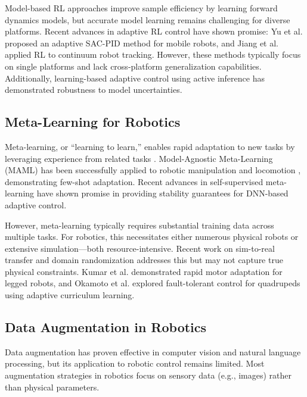 \documentclass[DTMColor]{ROB-New}
\begin{document}
Model-based RL approaches \cite{nagabandi2018neural} improve sample efficiency by learning forward dynamics models, but accurate model learning remains challenging for diverse platforms. Recent advances in adaptive RL control have shown promise: Yu et al. \cite{yu2021adaptive} proposed an adaptive SAC-PID method for mobile robots, and Jiang et al. \cite{jiang2022rl} applied RL to continuum robot tracking. However, these methods typically focus on single platforms and lack cross-platform generalization capabilities. Additionally, learning-based adaptive control using active inference \cite{pezzato2020active} has demonstrated robustness to model uncertainties.

\subsection{Meta-Learning for Robotics}

Meta-learning, or ``learning to learn,'' enables rapid adaptation to new tasks by leveraging experience from related tasks \cite{hospedales2021meta}. Model-Agnostic Meta-Learning (MAML) \cite{finn2017model} has been successfully applied to robotic manipulation \cite{finn2017one} and locomotion \cite{yu2020meta}, demonstrating few-shot adaptation. Recent advances in self-supervised meta-learning \cite{he2024self} have shown promise in providing stability guarantees for DNN-based adaptive control.

However, meta-learning typically requires substantial training data across multiple tasks. For robotics, this necessitates either numerous physical robots or extensive simulation—both resource-intensive. Recent work on sim-to-real transfer \cite{tobin2017domain} and domain randomization \cite{peng2018sim} addresses this but may not capture true physical constraints. Kumar et al. \cite{kumar2021rma} demonstrated rapid motor adaptation for legged robots, and Okamoto et al. \cite{okamoto2021robust} explored fault-tolerant control for quadrupeds using adaptive curriculum learning.

\subsection{Data Augmentation in Robotics}

Data augmentation has proven effective in computer vision \cite{shorten2019survey} and natural language processing, but its application to robotic control remains limited. Most augmentation strategies in robotics focus on sensory data (e.g., images) rather than physical parameters.
\end{document}
